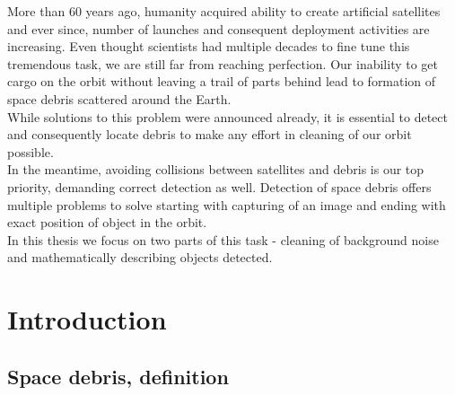 \documentclass[12pt, a4paper, oneside]{book}
\begin{document}
More than 60 years ago, humanity acquired ability to create artificial satellites and ever since, number of launches and consequent deployment activities are increasing.
Even thought scientists had multiple decades to fine tune this tremendous task, we are still far from reaching perfection.
Our inability to get cargo on the orbit without leaving a trail of parts behind lead to formation of space debris scattered around the Earth.\\
While solutions to this problem were announced already, it is essential to detect and consequently locate debris to make any effort in cleaning of our orbit possible.\\
In the meantime, avoiding collisions between satellites and debris is our top priority, demanding correct detection as well.
Detection of space debris offers multiple problems to solve starting with capturing of an image and ending with exact position of object in the orbit.\\
In this thesis we focus on two parts of this task - cleaning of background noise and mathematically describing objects detected.

\chapter{Introduction}

\section{Space debris, definition}
\end{document}
